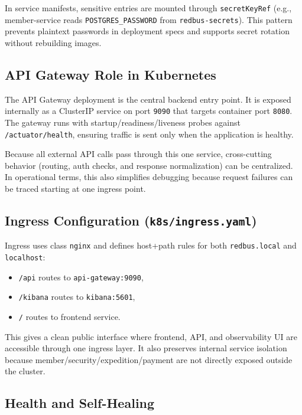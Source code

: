 \documentclass[12pt,a4paper]{article}
\begin{document}
In service manifests, sensitive entries are mounted through \texttt{secretKeyRef} (e.g., member-service reads \texttt{POSTGRES\_PASSWORD} from \texttt{redbus-secrets}). This pattern prevents plaintext passwords in deployment specs and supports secret rotation without rebuilding images.

\subsection{API Gateway Role in Kubernetes}

The API Gateway deployment is the central backend entry point. It is exposed internally as a ClusterIP service on port \texttt{9090} that targets container port \texttt{8080}. The gateway runs with startup/readiness/liveness probes against \texttt{/actuator/health}, ensuring traffic is sent only when the application is healthy.

Because all external API calls pass through this one service, cross-cutting behavior (routing, auth checks, and response normalization) can be centralized. In operational terms, this also simplifies debugging because request failures can be traced starting at one ingress point.

\subsection{Ingress Configuration (\texttt{k8s/ingress.yaml})}

Ingress uses class \texttt{nginx} and defines host+path rules for both \texttt{redbus.local} and \texttt{localhost}:
\begin{itemize}
    \item \texttt{/api} routes to \texttt{api-gateway:9090},
    \item \texttt{/kibana} routes to \texttt{kibana:5601},
    \item \texttt{/} routes to frontend service.
\end{itemize}

This gives a clean public interface where frontend, API, and observability UI are accessible through one ingress layer. It also preserves internal service isolation because member/security/expedition/payment are not directly exposed outside the cluster.

\subsection{Health and Self-Healing}
\end{document}
